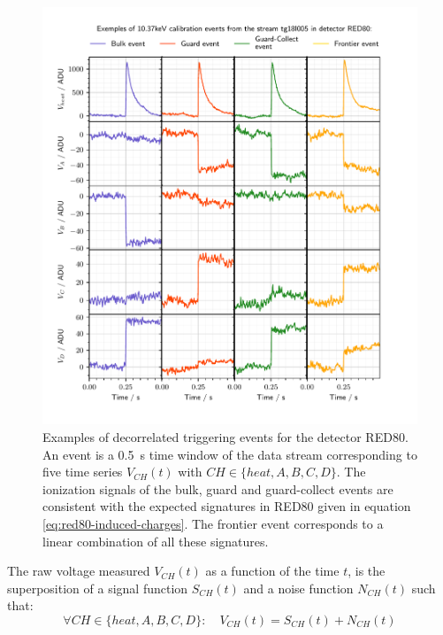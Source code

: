 \begin{figure}
\centering
\includegraphics[scale=1]{Figures/ElectrodesExperimental/pulse_raw.pdf}
\caption{Examples of decorrelated triggering events for the detector RED80. An event is a \SI{0.5}{\s} time window of the data stream corresponding to five time series $V_{CH}(t)$ with $CH \in \{heat, A,B,C,D\}$. The ionization signals of the bulk, guard and guard-collect events are consistent with the expected signatures in RED80 given in equation \ref{eq:red80-induced-charges}. The frontier event corresponds to a linear combination of all these signatures.}
\label{fig:pulse-raw}
\end{figure}

The raw voltage measured $V_{CH}(t)$ as a function of the time $t$, is the superposition of a signal function $S_{CH}(t)$ and a noise function $N_{CH}(t)$ such that:
\begin{equation}
\label{eq:raw-signal-noise}
\forall CH \in \{ heat, A, B, C, D \}: \quad V_{CH}(t) = S_{CH}(t) + N_{CH}(t)
\end{equation}


